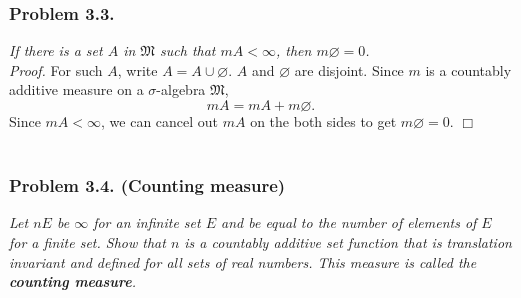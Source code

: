 \documentclass{article}
\begin{document}



\subsubsection*{Problem 3.3.}
\emph{If there is a set $A$ in $\mathfrak{M}$ such that $mA < \infty$,
then $m\varnothing = 0$.} \\



\emph{Proof.}
For such $A$, write $A = A \cup \varnothing$.
$A$ and $\varnothing$ are disjoint.
Since $m$ is a countably additive measure
on a $\sigma$-algebra $\mathfrak{M}$,
\[
  mA = mA + m\varnothing.
\]
Since $mA < \infty$,
we can cancel out $mA$ on the both sides to get
$m\varnothing = 0$.
$\Box$ \\\\






\subsubsection*{Problem 3.4. (Counting measure)}
\emph{Let $nE$ be $\infty$ for an infinite set $E$ and
be equal to the number of elements of $E$ for a finite set.
Show that $n$ is a countably additive set function that is translation invariant and
defined for all sets of real numbers.
This measure is called the \textbf{counting measure}.} \\
\end{document}
